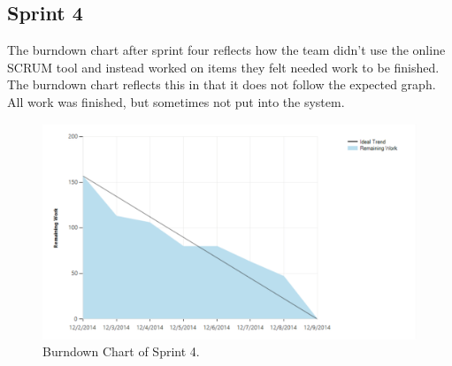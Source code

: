 \subsection{Sprint 4}
The burndown chart after sprint four reflects how the team didn't use the online SCRUM tool and instead worked on items they felt needed work to be finished. The burndown chart reflects this in that it does not follow the expected graph. All work was finished, but sometimes not put into the system. \\

\begin{figure}[H]
	\centering
	\includegraphics[scale=0.40]{Figures/Burndown3}
	\caption{Burndown Chart of Sprint 4.}
\end{figure}